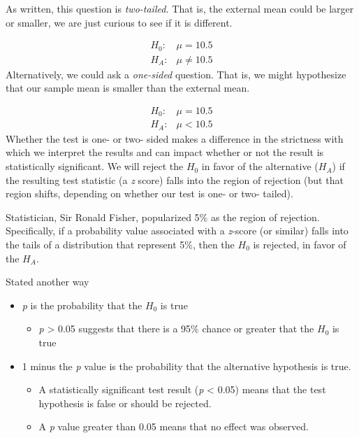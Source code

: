 \documentclass[
  11pt,
]{book}
\providecommand{\tightlist}{%
  \setlength{\itemsep}{0pt}\setlength{\parskip}{0pt}}
\begin{document}
As written, this question is \emph{two-tailed.} That is, the external mean could be larger or smaller, we are just curious to see if it is different.

\[
\begin{array}{ll}
H_0: & \mu = 10.5 \\
H_A: & \mu \neq 10.5
\end{array}
\] Alternatively, we could ask a \emph{one-sided} question. That is, we might hypothesize that our sample mean is smaller than the external mean.

\[
\begin{array}{ll}
H_0: & \mu = 10.5 \\
H_A: & \mu < 10.5
\end{array}
\] Whether the test is one- or two- sided makes a difference in the strictness with which we interpret the results and can impact whether or not the result is statistically significant. We will reject the \(H_0\) in favor of the alternative (\(H_A\)) if the resulting test statistic (a \emph{z} score) falls into the region of rejection (but that region shifts, depending on whether our test is one- or two- tailed).

Statistician, Sir Ronald Fisher, popularized 5\% as the region of rejection. Specifically, if a probability value associated with a \emph{z}-score (or similar) falls into the tails of a distribution that represent 5\%, then the \(H_0\) is rejected, in favor of the \(H_A\).

Stated another way

\begin{itemize}
\tightlist
\item
  \emph{p} is the probability that the \(H_0\) is true

  \begin{itemize}
  \tightlist
  \item
    \emph{p} \textgreater{} 0.05 suggests that there is a 95\% chance or greater that the \(H_0\) is true
  \end{itemize}
\item
  1 minus the \emph{p} value is the probability that the alternative hypothesis is true.

  \begin{itemize}
  \tightlist
  \item
    A statistically significant test result (\emph{p} \textless{} 0.05) means that the test hypothesis is false or should be rejected.
  \item
    A \emph{p} value greater than 0.05 means that no effect was observed.
  \end{itemize}
\end{itemize}
\end{document}
